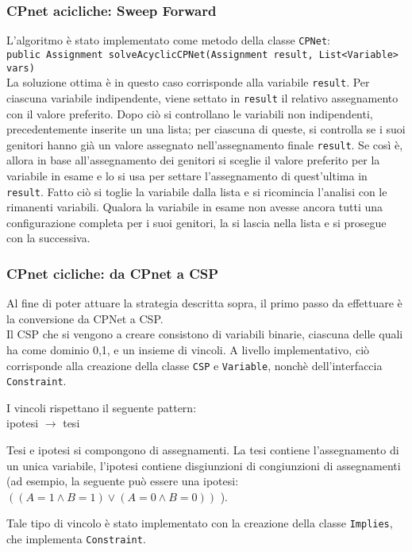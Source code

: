 \subsubsection{CPnet acicliche: Sweep Forward}
L'algoritmo è stato implementato come metodo della classe \texttt{CPNet}:\\
\texttt{public Assignment solveAcyclicCPNet(Assignment result, List<Variable> vars)}
\\
La soluzione ottima è in questo caso corrisponde alla variabile \texttt{result}.
Per ciascuna variabile indipendente, viene settato in \texttt{result} il relativo assegnamento con il valore preferito.
Dopo ciò si controllano le variabili non indipendenti, precedentemente inserite un una lista; per ciascuna di queste, si controlla se i suoi genitori hanno già un valore assegnato nell'assegnamento finale \texttt{result}. Se così è, allora in base all'assegnamento dei genitori si sceglie il valore preferito per la variabile in esame e lo si usa per settare l'assegnamento di quest'ultima in \texttt{result}. Fatto ciò si toglie la variabile dalla lista e si ricomincia l'analisi con le rimanenti variabili. Qualora la variabile in esame non avesse ancora tutti una configurazione completa per i suoi genitori, la si lascia nella lista e si prosegue con la successiva.

\subsubsection{CPnet cicliche: da CPnet a CSP}
Al fine di poter attuare la strategia descritta sopra, il primo passo da effettuare è la conversione da CPNet a CSP. 
\\
Il CSP che si vengono a creare consistono di variabili binarie, ciascuna delle quali ha come dominio {0,1}, e un insieme di vincoli.
A livello implementativo, ciò corrisponde alla creazione della classe \texttt{CSP} e \texttt{Variable}, nonchè dell'interfaccia \texttt{Constraint}.
 
I vincoli rispettano il seguente pattern:
\\
ipotesi $\rightarrow$ tesi

Tesi e ipotesi si compongono di assegnamenti. La tesi contiene l'assegnamento di un unica variabile, l'ipotesi contiene disgiunzioni di congiunzioni di assegnamenti (ad esempio, la seguente può essere una ipotesi: $( (A=1 \land B=1) \lor (A=0 \land B=0))$ ). 

Tale tipo di vincolo è stato implementato con la creazione della classe \texttt{Implies}, che implementa \texttt{Constraint}.


